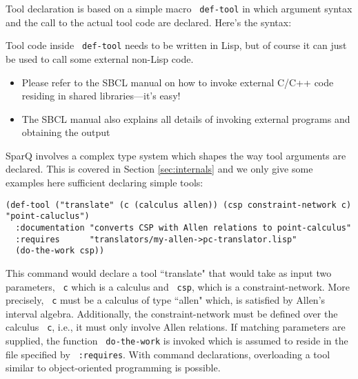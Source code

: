 \documentclass[headsepline]{scrreprt}
\theoremstyle{definition}
\newcommand{\engine}{SparQ}
\begin{document}
\begin{nopagebreak}
Tool declaration is based on a simple macro \texttt{ def-tool} in which argument syntax and the call to the actual tool code are  declared. Here's the syntax:\\ \noindent
\medskip
\centerline{}
\medskip
\end{nopagebreak}

Tool code inside \texttt{ def-tool} needs to be written in Lisp, but of course it can just be used to call some external non-Lisp code.

\begin{itemize}
	\item Please refer to the SBCL manual on how to invoke external C/C++ code residing in shared libraries---it's easy!
	\item The SBCL manual also explains all details of invoking external programs and obtaining the output
\end{itemize}

\engine{} involves a complex type system which shapes the way tool arguments are declared. This is covered in Section \ref{sec:internals} and we only give some examples here sufficient declaring simple tools:

\begin{lstlisting}
(def-tool ("translate" (c (calculus allen)) (csp constraint-network c) "point-caluclus")
  :documentation "converts CSP with Allen relations to point-calculus"
  :requires      "translators/my-allen->pc-translator.lisp"
  (do-the-work csp))
\end{lstlisting}
This command would declare a tool ``translate" that would take as input two parameters, \texttt{ c} which is a calculus and \texttt{ csp}, which is a constraint-network. More precisely, \texttt{ c} must be a calculus of type ``allen" which, is satisfied by Allen's interval algebra. Additionally, the constraint-network must be defined over the calculus \texttt{ c}, i.e., it must only involve Allen relations. If matching parameters are supplied, the function \texttt{ do-the-work} is invoked which is assumed to reside in the file specified by \texttt{ :requires}.
With command declarations, overloading a tool similar to object-oriented programming is possible.
\end{document}
